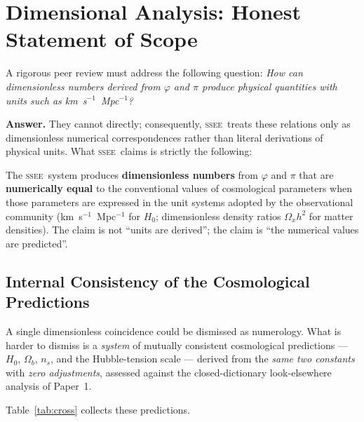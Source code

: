 \documentclass[12pt,a4paper]{article}
\newcommand{\SSEE}{\ifmmode\mathrm{SSEE}\else\textsc{ssee}\fi}
\begin{document}
\section{Dimensional Analysis: Honest Statement of Scope}
\label{sec:dimensional}

A rigorous peer review must address the following question:
\emph{How can dimensionless numbers derived from $\varphi$ and $\pi$ produce
physical quantities with units such as km~s$^{-1}$~Mpc$^{-1}$?}

\textbf{Answer.}
They cannot directly; consequently, \SSEE\ treats these relations only as dimensionless numerical correspondences rather than literal derivations of physical units.
What \SSEE\ claims is strictly the following:

\begin{tcolorbox}[colback=blue!5,colframe=blue!50,title=Scope of SSEE Predictions]
The \SSEE\ system produces \textbf{dimensionless numbers} from $\varphi$ and
$\pi$ that are \textbf{numerically equal} to the conventional values of
cosmological parameters when those parameters are expressed in the unit
systems adopted by the observational community
(km~s$^{-1}$~Mpc$^{-1}$ for $H_0$; dimensionless density ratios $\Omega_x h^2$
for matter densities).
The claim is not ``units are derived''; the claim is
``the numerical values are predicted''.
\end{tcolorbox}

\subsection{Internal Consistency of the Cosmological Predictions}
\label{sec:numerology}

A single dimensionless coincidence could be dismissed as numerology.
What is harder to dismiss is a \emph{system} of mutually consistent
cosmological predictions --- $H_0$, $\Omega_b$, $n_s$, and the
Hubble-tension scale --- derived from the \emph{same two constants}
with \emph{zero adjustments}, assessed against the closed-dictionary
look-elsewhere analysis of Paper~1.

Table~\ref{tab:cross} collects these predictions.
\end{document}
